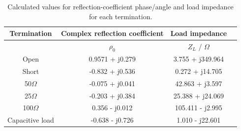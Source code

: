 \begin{table}[ht!]
	\centering
	\begin{tabular}{|c|c|c|c|}
		\hline
		\textbf{Termination} & \textbf{Complex reflection coefficient} & \textbf{Load impedance} \\
		\hline 
		& \underline{$\rho_0$} & $Z_L$ / $\Omega$ \\
		\hline \hline
		Open            & 0.9571 + j0.279 	& 3.755 + j349.964 	\\
		\hline
		Short           & -0.832 + j0.536 & 0.272 + j14.705 	\\
		\hline
		50$\Omega$      & -0.075 + j0.041 & 42.863 + j3.597		\\
		\hline
		25$\Omega$      & -0.203 + j0.384 & 25.388 + j24.069 	\\
		\hline
		100$\Omega$     & 0.356 - j0.012 & 105.411 - j2.995 	\\
		\hline
		Capacitive load & -0.638 - j0.726 & 1.010 - j22.601 	\\
		\hline
	\end{tabular}
	\caption{\centering Calculated values for reflection-coefficient phase/angle and load impedance for each termination.}
	\label{tab:load_impedances}
\end{table}
